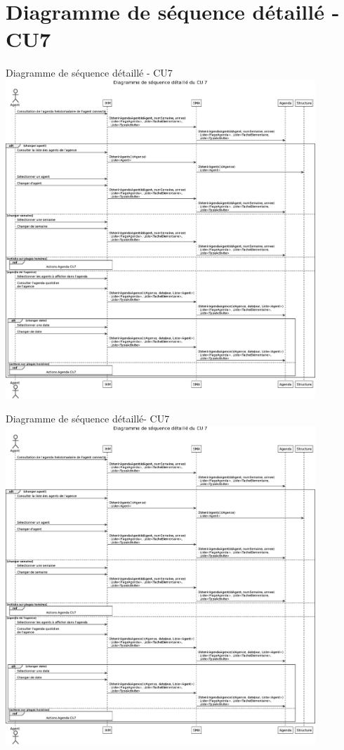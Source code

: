 \documentclass[xetex]{beamer}
\begin{document}
    \section{Diagramme de séquence détaillé - CU7}
    \begin{frame}{Diagramme de séquence détaillé - CU7}
  {\includegraphics[height=12cm]{../report/figures/eps/DSD_CU7}}
    \end{frame}
    
    
        \begin{frame}{Diagramme de séquence détaillé- CU7}
  {\includegraphics[height=12cm]{../report/figures/eps/DSD_CU7}}
    \end{frame}
    
\end{document}

